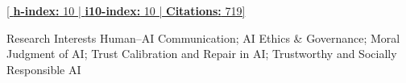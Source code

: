 \documentclass{resume} %
\begin{document}



\begin{center}


\href{https://scholar.google.com/citations?user=Z7eBaGgAAAAJ&hl=en}{[ \textbf{h-index:} 10 | \textbf{i10-index:} 10 | \textbf{Citations:} 719]}


\end{center}


\begin{rSection}{Research Interests}
Human–AI Communication; AI Ethics \& Governance; Moral Judgment of AI; Trust Calibration and Repair in AI; Trustworthy and Socially Responsible AI
\end{rSection}
\end{document}
